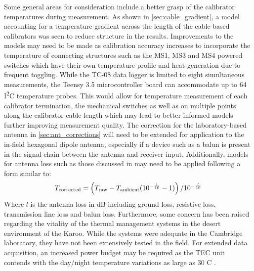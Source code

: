 Some general areas for consideration include a better grasp of the calibrator temperatures during measurement. As shown in \cref{sec:cable_gradient}, a model accounting for a temperature gradient across the length of the cable-based calibrators was seen to reduce structure in the results. Improvements to the models may need to be made as calibration accuracy increases to incorporate the temperature of connecting structures such as the MS1, MS3 and MS4 powered switches which have their own temperature profile and heat generation due to frequent toggling. While the TC-08 data logger is limited to eight simultaneous measurements, the Teensy 3.5 microcontroller board can accommodate up to 64 I\textsuperscript{2}C temperature probes. This would allow for temperature measurement of each calibrator termination, the mechanical switches as well as on multiple points along the calibrator cable length which may lead to better informed models further improving measurement quality. The correction for the laboratory-based antenna in \cref{sec:ant_corrections} will need to be extended for application to the in-field hexagonal dipole antenna, especially if a device such as a balun is present in the signal chain between the antenna and receiver input. Additionally, models for antenna loss such as those discussed in \citet{rogersCal} may need to be applied following a form similar to:
\begin{equation}
    T_{\mathrm{corrected}} = \left( T_{\mathrm{raw}} - T_{\mathrm{ambient}}(10^{-\frac{l}{10}} - 1) \right) / 10^{-\frac{l}{10}} 
    \label{eqn:ant_loss}
\end{equation}
Where $l$ is the antenna loss in dB including ground loss, resistive loss, transmission line loss and balun loss. Furthermore, some concern has been raised regarding the vitality of the thermal management systems in the desert environment of the Karoo. While the systems were adequate in the Cambridge laboratory, they have not been extensively tested in the field. For extended data acquisition, an increased power budget may be required as the TEC unit contends with the day/night temperature variations as large as 30 \textdegree C \citep{karoo_temp}.

